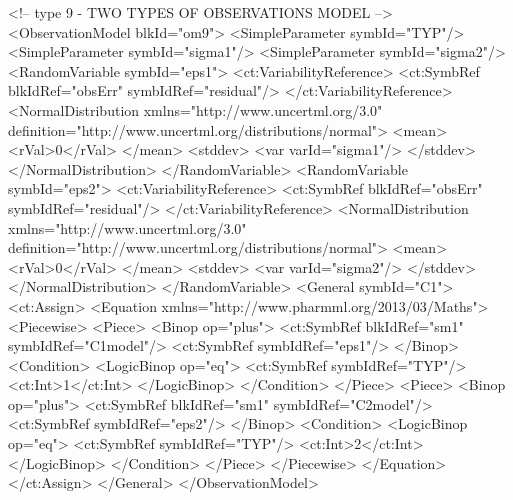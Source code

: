 \documentclass[a4paper,10pt]{article}
\begin{document}
\begin{xmlcode}
<!-- type 9 - TWO TYPES OF OBSERVATIONS MODEL -->
<ObservationModel blkId="om9">
    <SimpleParameter symbId="TYP"/>
    <SimpleParameter symbId="sigma1"/>
    <SimpleParameter symbId="sigma2"/>
    <RandomVariable symbId="eps1">
        <ct:VariabilityReference>
            <ct:SymbRef blkIdRef="obsErr" symbIdRef="residual"/>
        </ct:VariabilityReference>
        <NormalDistribution xmlns="http://www.uncertml.org/3.0" definition="http://www.uncertml.org/distributions/normal">
            <mean>
                <rVal>0</rVal>
            </mean>
            <stddev>
                <var varId="sigma1"/>
            </stddev>
        </NormalDistribution>
    </RandomVariable>
    <RandomVariable symbId="eps2">
        <ct:VariabilityReference>
            <ct:SymbRef blkIdRef="obsErr" symbIdRef="residual"/>
        </ct:VariabilityReference>
        <NormalDistribution xmlns="http://www.uncertml.org/3.0" definition="http://www.uncertml.org/distributions/normal">
            <mean>
                <rVal>0</rVal>
            </mean>
            <stddev>
                <var varId="sigma2"/>
            </stddev>
        </NormalDistribution>
    </RandomVariable>
    <General symbId="C1">
        <ct:Assign>
            <Equation xmlns="http://www.pharmml.org/2013/03/Maths">
                <Piecewise>
                    <Piece>
                        <Binop op="plus">
                            <ct:SymbRef blkIdRef="sm1" symbIdRef="C1model"/>
                            <ct:SymbRef symbIdRef="eps1"/>
                        </Binop>
                        <Condition>
                            <LogicBinop op="eq">
                                <ct:SymbRef symbIdRef="TYP"/>
                                <ct:Int>1</ct:Int>
                            </LogicBinop>
                        </Condition>
                    </Piece>
                    <Piece>
                        <Binop op="plus">
                            <ct:SymbRef blkIdRef="sm1" symbIdRef="C2model"/>
                            <ct:SymbRef symbIdRef="eps2"/>
                        </Binop>
                        <Condition>
                            <LogicBinop op="eq">
                                <ct:SymbRef symbIdRef="TYP"/>
                                <ct:Int>2</ct:Int>
                            </LogicBinop>
                        </Condition>
                    </Piece> 
                </Piecewise> 
            </Equation> 
        </ct:Assign> 
    </General> 
</ObservationModel> 
\end{xmlcode}
\end{document}
